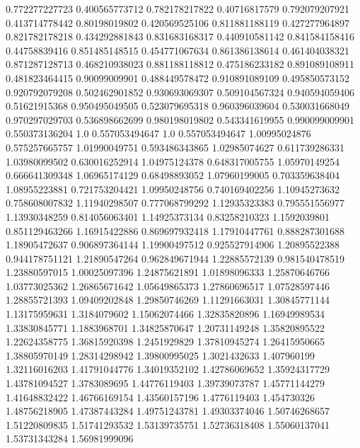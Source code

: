  0.772277227723   0.400565773712
 0.782178217822    0.40716817579
 0.792079207921   0.413714778442
  0.80198019802   0.420569525106
 0.811881188119   0.427277964897
 0.821782178218   0.434292881843
 0.831683168317   0.440910581142
 0.841584158416    0.44758839416
 0.851485148515   0.454771067634
 0.861386138614   0.461404038321
 0.871287128713   0.468210938023
 0.881188118812   0.475186233182
 0.891089108911   0.481823464415
  0.90099009901   0.488449578472
 0.910891089109   0.495850573152
 0.920792079208   0.502462901852
 0.930693069307   0.509104567324
 0.940594059406    0.51621915368
 0.950495049505   0.523079695318
 0.960396039604   0.530031668049
 0.970297029703   0.536898662699
 0.980198019802   0.543341619955
 0.990099009901   0.550373136204
            1.0   0.557053494647
            1.0   0.557053494647
  1.00995024876   0.575257665757
  1.01990049751   0.593486343865
  1.02985074627   0.611739286331
  1.03980099502   0.630016252914
  1.04975124378   0.648317005755
  1.05970149254   0.666641309348
  1.06965174129    0.68498893052
  1.07960199005   0.703359638404
  1.08955223881   0.721753204421
  1.09950248756   0.740169402256
  1.10945273632   0.758608007832
  1.11940298507   0.777068799292
  1.12935323383   0.795551556977
  1.13930348259   0.814056063401
  1.14925373134    0.83258210323
   1.1592039801   0.851129463266
  1.16915422886   0.869697932418
  1.17910447761   0.888287301688
  1.18905472637   0.906897364144
  1.19900497512   0.925527914906
  1.20895522388   0.944178751121
  1.21890547264   0.962849671944
  1.22885572139   0.981540478519
  1.23880597015    1.00025097396
  1.24875621891    1.01898096333
  1.25870646766    1.03773025362
  1.26865671642    1.05649865373
  1.27860696517    1.07528597446
  1.28855721393    1.09409202848
  1.29850746269    1.11291663031
  1.30845771144    1.13175959631
   1.3184079602    1.15062074466
  1.32835820896    1.16949989534
  1.33830845771     1.1883968701
  1.34825870647    1.20731149248
  1.35820895522    1.22624358775
  1.36815920398     1.2451929829
  1.37810945274    1.26415950665
  1.38805970149    1.28314298942
  1.39800995025     1.3021432633
    1.407960199    1.32116016203
  1.41791044776    1.34019352102
  1.42786069652    1.35924317729
  1.43781094527     1.3783089695
  1.44776119403    1.39739073787
  1.45771144279    1.41648832422
  1.46766169154    1.43560157196
   1.4776119403      1.454730326
  1.48756218905    1.47387443284
  1.49751243781    1.49303374046
  1.50746268657    1.51220809835
  1.51741293532    1.53139735751
  1.52736318408    1.55060137041
  1.53731343284    1.56981999096
